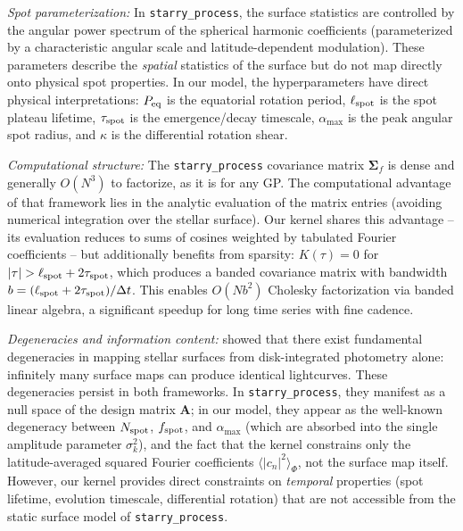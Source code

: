 \documentclass[preprint]{aastex702}
\newcommand{\code}[1]{{\texttt{#1}}}
\begin{document}
\textit{Spot parameterization: }
In \code{starry\_process}, the surface statistics are controlled by the angular power spectrum of the spherical harmonic coefficients (parameterized by a characteristic angular scale and latitude-dependent modulation). These parameters describe the \emph{spatial} statistics of the surface but do not map directly onto physical spot properties. In our model, the hyperparameters have direct physical interpretations: $P_{\rm eq}$ is the equatorial rotation period, $\ell_{\rm spot}$ is the spot plateau lifetime, $\tau_{\rm spot}$ is the emergence/decay timescale, $\alpha_{\max}$ is the peak angular spot radius, and $\kappa$ is the differential rotation shear.

\textit{Computational structure: }
The \code{starry\_process} covariance matrix $\boldsymbol{\Sigma}_f$ is dense and generally $O(N^3)$ to factorize, as it is for any GP. The computational advantage of that framework lies in the analytic evaluation of the matrix entries (avoiding numerical integration over the stellar surface). Our kernel shares this advantage -- its evaluation reduces to sums of cosines weighted by tabulated Fourier coefficients -- but additionally benefits from sparsity: $K(\tau) = 0$ for $|\tau| > \ell_{\rm spot} + 2\tau_{\rm spot}$, which produces a banded covariance matrix with bandwidth $b = (\ell_{\rm spot} + 2\tau_{\rm spot})/\Delta t$. This enables $O(Nb^2)$ Cholesky factorization via banded linear algebra, a significant speedup for long time series with fine cadence.

\textit{Degeneracies and information content: }
\citet{luger_mapping_2021} showed that there exist fundamental degeneracies in mapping stellar surfaces from disk-integrated photometry alone: infinitely many surface maps can produce identical lightcurves. These degeneracies persist in both frameworks. In \code{starry\_process}, they manifest as a null space of the design matrix $\mathbf{A}$; in our model, they appear as the well-known degeneracy between $N_{\rm spot}$, $f_{\rm spot}$, and $\alpha_{\max}$ (which are absorbed into the single amplitude parameter $\sigma_k^2$), and the fact that the kernel constrains only the latitude-averaged squared Fourier coefficients $\langle |c_n|^2 \rangle_\Phi$, not the surface map itself. However, our kernel provides direct constraints on \emph{temporal} properties (spot lifetime, evolution timescale, differential rotation) that are not accessible from the static surface model of \code{starry\_process}.


\vspace{\baselineskip}
\end{document}
